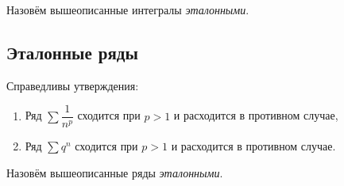 \begin{remark}
	Назовём вышеописанные интегралы \textit{эталонными}.
\end{remark}

\subsection{\color{red} Эталонные ряды}

\begin{lemma}
	Справедливы утверждения:
	\begin{enumerate}
		\item Ряд  \(\sum \dfrac{1}{n^p}\) сходится при \(p > 1\) и расходится в противном случае,
		\item Ряд \(\sum q^n\) сходится при \(p > 1\) и расходится в противном случае.
	\end{enumerate}
\end{lemma}

\begin{remark}
	Назовём вышеописанные ряды \textit{эталонными}.
\end{remark}